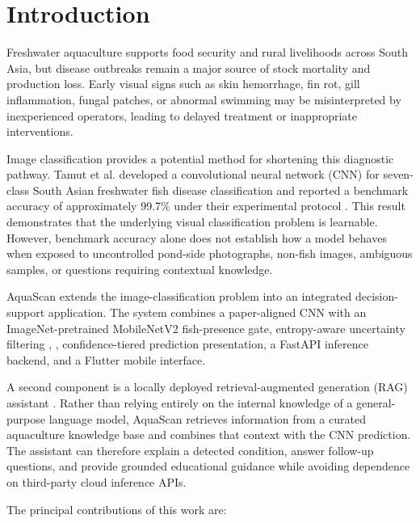 \documentclass[conference]{IEEEtran}
\begin{document}

\section{Introduction}

Freshwater aquaculture supports food security and rural livelihoods across South Asia, but disease outbreaks remain a major source of stock mortality and production loss. Early visual signs such as skin hemorrhage, fin rot, gill inflammation, fungal patches, or abnormal swimming may be misinterpreted by inexperienced operators, leading to delayed treatment or inappropriate interventions.

Image classification provides a potential method for shortening this diagnostic pathway. Tamut et al. developed a convolutional neural network (CNN) for seven-class South Asian freshwater fish disease classification and reported a benchmark accuracy of approximately 99.7\% under their experimental protocol \cite{b1}. This result demonstrates that the underlying visual classification problem is learnable. However, benchmark accuracy alone does not establish how a model behaves when exposed to uncontrolled pond-side photographs, non-fish images, ambiguous samples, or questions requiring contextual knowledge.

AquaScan extends the image-classification problem into an integrated decision-support application. The system combines a paper-aligned CNN \cite{b1} with an ImageNet-pretrained \cite{b26} MobileNetV2 \cite{b7} fish-presence gate, entropy-aware uncertainty filtering \cite{b24}, \cite{b25}, confidence-tiered prediction presentation, a FastAPI \cite{b15} inference backend, and a Flutter \cite{b14} mobile interface.

A second component is a locally deployed retrieval-augmented generation (RAG) assistant \cite{b4}. Rather than relying entirely on the internal knowledge of a general-purpose language model, AquaScan retrieves information from a curated aquaculture knowledge base and combines that context with the CNN prediction. The assistant can therefore explain a detected condition, answer follow-up questions, and provide grounded educational guidance while avoiding dependence on third-party cloud inference APIs.

The principal contributions of this work are:
\end{document}
